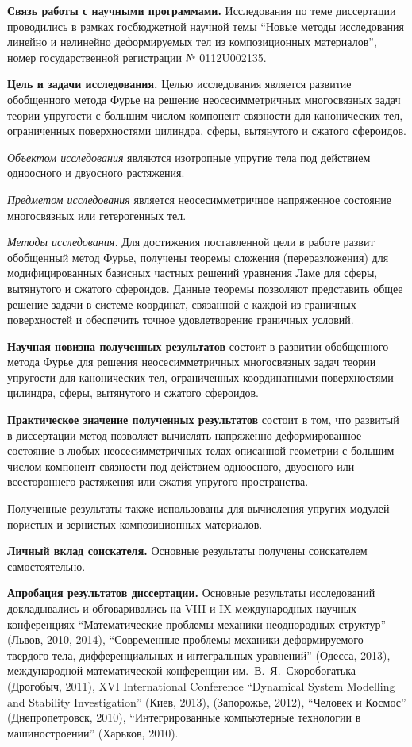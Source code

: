 {\bf Связь работы с научными программами.} Исследования по теме диссертации проводились в рамках госбюджетной научной темы ``Новые методы исследования линейно и нелинейно деформируемых тел из композиционных материалов'', номер государственной регистрации № 0112U002135. 

{\bf Цель и задачи исследования.} Целью исследования является развитие обобщенного метода Фурье на решение неосесимметричных многосвязных задач теории упругости с большим числом компонент связности для канонических тел, ограниченных поверхностями цилиндра, сферы, вытянутого и сжатого сфероидов. 

{\it Объектом исследования} являются изотропные упругие тела под действием одноосного и двуосного растяжения.

{\it Предметом исследования} является неосесимметричное напряженное состояние многосвязных или гетерогенных тел.

{\it Методы исследования.} Для достижения поставленной цели в работе развит обобщенный метод Фурье, получены теоремы сложения (переразложения) для модифицированных базисных частных решений уравнения Ламе для сферы, вытянутого и сжатого сфероидов. Данные теоремы позволяют представить общее решение задачи в системе координат, связанной с каждой из граничных поверхностей и обеспечить точное удовлетворение граничных условий.

{\bf Научная новизна полученных результатов} состоит в развитии обобщенного метода Фурье для решения неосесимметричных многосвязных задач теории упругости для канонических тел, ограниченных координатными поверхностями цилиндра, сферы, вытянутого и сжатого сфероидов.

{\bf Практическое значение полученных результатов} состоит в том, что развитый в диссертации метод позволяет вычислять на\-пряжен\-но-де\-форми\-ро\-ван\-ное состояние в любых неосесимметричных телах описанной геометрии с большим числом компонент связности под действием одноосного, двуосного или всестороннего растяжения или сжатия упругого пространства.

Полученные результаты также использованы для вычисления упругих модулей пористых и зернистых композиционных материалов.

{\bf Личный вклад соискателя.} Основные результаты получены соискателем самостоятельно.

{\bf Апробация результатов диссертации.} Основные результаты исследований докладывались и обговаривались на VIII и IX международных научных конференциях ``Математические проблемы механики неоднородных структур'' (Львов, 2010, 2014), ``Современные проблемы механики деформируемого твердого тела, дифференциальных и интегральных уравнений'' (Одесса, 2013), международной математической конференции им.~В.~Я.~Скоробогатька (Дрогобыч, 2011), XVI International Conference ``Dynamical System Modelling  and Stability Investigation'' (Киев, 2013), (Запорожье, 2012), ``Человек и Космос'' (Днепропетровск, 2010), ``Интегрированные компьютерные технологии в машиностроении'' (Харьков, 2010).

